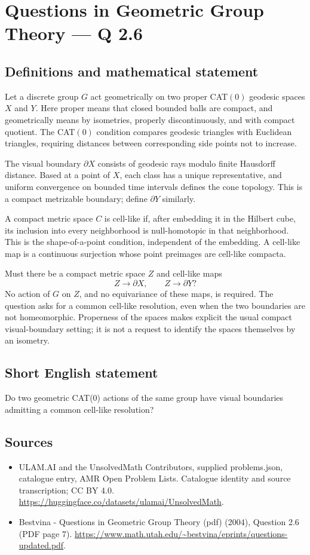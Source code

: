 \documentclass[11pt,a4paper]{article}
\begin{document}
\section*{Questions in Geometric Group Theory — Q 2.6}\label{statement}

\subsection{Definitions and mathematical statement}
Let a discrete group $G$ act geometrically on two proper CAT$(0)$ geodesic spaces $X$ and $Y$. Here proper means that closed bounded balls are compact, and geometrically means by isometries, properly discontinuously, and with compact quotient. The CAT$(0)$ condition compares geodesic triangles with Euclidean triangles, requiring distances between corresponding side points not to increase.

The visual boundary $\partial X$ consists of geodesic rays modulo finite Hausdorff distance. Based at a point of $X$, each class has a unique representative, and uniform convergence on bounded time intervals defines the cone topology. This is a compact metrizable boundary; define $\partial Y$ similarly.

A compact metric space $C$ is cell-like if, after embedding it in the Hilbert cube, its inclusion into every neighborhood is null-homotopic in that neighborhood. This is the shape-of-a-point condition, independent of the embedding. A cell-like map is a continuous surjection whose point preimages are cell-like compacta.

Must there be a compact metric space $Z$ and cell-like maps
\[
 Z\longrightarrow\partial X,\qquad Z\longrightarrow\partial Y?
\]
No action of $G$ on $Z$, and no equivariance of these maps, is required. The question asks for a common cell-like resolution, even when the two boundaries are not homeomorphic. Properness of the spaces makes explicit the usual compact visual-boundary setting; it is not a request to identify the spaces themselves by an isometry.
\subsection{Short English statement}
Do two geometric CAT(0) actions of the same group have visual boundaries admitting a common cell-like resolution?
\subsection{Sources}
\begin{itemize}
\item[S1] ULAM.AI and the UnsolvedMath Contributors, supplied problems.json, catalogue entry, AMR Open Problem Lists. Catalogue identity and source transcription; CC BY 4.0.
\url{https://huggingface.co/datasets/ulamai/UnsolvedMath}.
\item[S2] Bestvina - Questions in Geometric Group Theory (pdf) (2004), Question 2.6 (PDF page 7). 
\url{https://www.math.utah.edu/~bestvina/eprints/questions-updated.pdf}.
\end{itemize}
\end{document}
